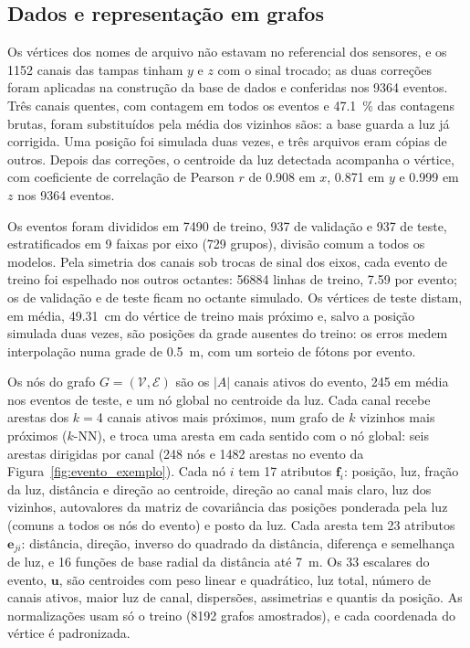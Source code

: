 \subsection{Dados e representação em grafos}
\label{sec:dados_grafos}

Os vértices dos nomes de arquivo não estavam no referencial dos sensores, e os \num{1152} canais das tampas tinham $y$ e $z$ com o sinal trocado; as duas correções foram aplicadas na construção da base de dados e conferidas nos \num{9364} eventos. Três canais quentes, com contagem em todos os eventos e \qty{47.1}{\percent} das contagens brutas, foram substituídos pela média dos vizinhos sãos: a base guarda a luz já corrigida. Uma posição foi simulada duas vezes, e três arquivos eram cópias de outros. Depois das correções, o centroide da luz detectada acompanha o vértice, com coeficiente de correlação de Pearson $r$ de \num{0.908} em $x$, \num{0.871} em $y$ e \num{0.999} em $z$ nos \num{9364} eventos.

Os eventos foram divididos em \num{7490} de treino, \num{937} de validação e \num{937} de teste, estratificados em \num{9} faixas por eixo (\num{729} grupos), divisão comum a todos os modelos. Pela simetria dos canais sob trocas de sinal dos eixos, cada evento de treino foi espelhado nos outros octantes: \num{56884} linhas de treino, \num{7.59} por evento; os de validação e de teste ficam no octante simulado. Os vértices de teste distam, em média, \qty{49.31}{\cm} do vértice de treino mais próximo e, salvo a posição simulada duas vezes, são posições da grade ausentes do treino: os erros medem interpolação numa grade de \qty{0.5}{\m}, com um sorteio de fótons por evento.

Os nós do grafo $G = (\mathcal{V}, \mathcal{E})$ são os $|A|$ canais ativos do evento, \num{245} em média nos eventos de teste, e um nó global \cite{gilmer2017neural} no centroide da luz. Cada canal recebe arestas dos $k = {}$\num{4} canais ativos mais próximos, num grafo de $k$ vizinhos mais próximos (\mbox{$k$-NN}), e troca uma aresta em cada sentido com o nó global: seis arestas dirigidas por canal (\num{248} nós e \num{1482} arestas no evento da Figura~\ref{fig:evento_exemplo}). Cada nó $i$ tem \num{17} atributos $\mathbf{f}_i$: posição, luz, fração da luz, distância e direção ao centroide, direção ao canal mais claro, luz dos vizinhos, autovalores da matriz de covariância das posições ponderada pela luz (comuns a todos os nós do evento) e posto da luz. Cada aresta tem \num{23} atributos $\mathbf{e}_{ji}$: distância, direção, inverso do quadrado da distância, diferença e semelhança de luz, e \num{16} funções de base radial da distância até \qty{7}{\m}. Os \num{33} escalares do evento, $\mathbf{u}$, são centroides com peso linear e quadrático, luz total, número de canais ativos, maior luz de canal, dispersões, assimetrias e quantis da posição. As normalizações usam só o treino (\num{8192} grafos amostrados), e cada coordenada do vértice é padronizada.

